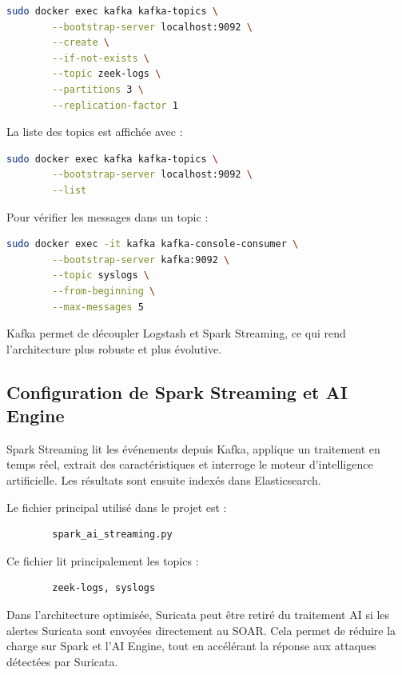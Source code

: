 \documentclass[12pt,a4paper,oneside]{report}
\begin{document}
    \begin{lstlisting}[language=bash]
    	sudo docker exec kafka kafka-topics \
    	--bootstrap-server localhost:9092 \
    	--create \
    	--if-not-exists \
    	--topic zeek-logs \
    	--partitions 3 \
    	--replication-factor 1
    \end{lstlisting}
    
    La liste des topics est affichée avec :
    
    \begin{lstlisting}[language=bash]
    	sudo docker exec kafka kafka-topics \
    	--bootstrap-server localhost:9092 \
    	--list
    \end{lstlisting}
    
    Pour vérifier les messages dans un topic :
    
    \begin{lstlisting}[language=bash]
    	sudo docker exec -it kafka kafka-console-consumer \
    	--bootstrap-server kafka:9092 \
    	--topic syslogs \
    	--from-beginning \
    	--max-messages 5
    \end{lstlisting}
    
    Kafka permet de découpler Logstash et Spark Streaming, ce qui rend l'architecture plus robuste et plus évolutive.
    
    \subsection{Configuration de Spark Streaming et AI Engine}
    
    Spark Streaming lit les événements depuis Kafka, applique un traitement en temps réel, extrait des caractéristiques et interroge le moteur d'intelligence artificielle. Les résultats sont ensuite indexés dans Elasticsearch.
    
    Le fichier principal utilisé dans le projet est :
    
    \begin{lstlisting}
    	spark_ai_streaming.py
    \end{lstlisting}
    
    Ce fichier lit principalement les topics :
    
    \begin{lstlisting}
    	zeek-logs, syslogs
    \end{lstlisting}
    
    Dans l'architecture optimisée, Suricata peut être retiré du traitement AI si les alertes Suricata sont envoyées directement au SOAR. Cela permet de réduire la charge sur Spark et l'AI Engine, tout en accélérant la réponse aux attaques détectées par Suricata.
    
\end{document}
